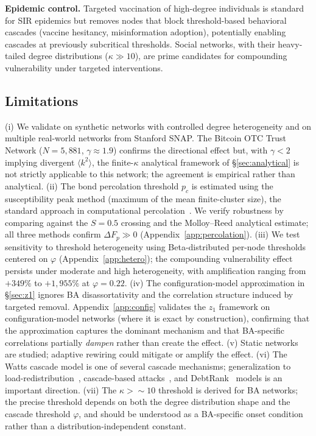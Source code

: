 \documentclass[aps,pre,twocolumn,superscriptaddress,showpacs]{revtex4-2}
\newcommand{\avg}[1]{\langle #1 \rangle}
\newcommand{\pc}{p_c}
\newcommand{\DF}{\Delta F}
\begin{document}
\textbf{Epidemic control.} Targeted vaccination of high-degree individuals is standard for SIR epidemics but removes nodes that block threshold-based behavioral cascades (vaccine hesitancy, misinformation adoption), potentially enabling cascades at previously subcritical thresholds. Social networks, with their heavy-tailed degree distributions ($\kappa \gg 10$), are prime candidates for compounding vulnerability under targeted interventions.

\subsection{Limitations}
\label{sec:limitations}

(i) We validate on synthetic networks with controlled degree heterogeneity and on multiple real-world networks from Stanford SNAP. The Bitcoin OTC Trust Network ($N=5{,}881$, $\gamma \approx 1.9$) confirms the directional effect but, with $\gamma < 2$ implying divergent $\avg{k^2}$, the finite-$\kappa$ analytical framework of \S\ref{sec:analytical} is not strictly applicable to this network; the agreement is empirical rather than analytical. (ii) The bond percolation threshold $\pc$ is estimated using the susceptibility peak method (maximum of the mean finite-cluster size), the standard approach in computational percolation~\cite{Newman2001}. We verify robustness by comparing against the $S=0.5$ crossing and the Molloy--Reed analytical estimate; all three methods confirm $\DF_p \gg 0$ (Appendix~\ref{app:percolation}). (iii) We test sensitivity to threshold heterogeneity using Beta-distributed per-node thresholds centered on $\varphi$ (Appendix~\ref{app:hetero}); the compounding vulnerability effect persists under moderate and high heterogeneity, with amplification ranging from $+349\%$ to $+1{,}955\%$ at $\varphi=0.22$. (iv) The configuration-model approximation in \S\ref{sec:z1} ignores BA disassortativity and the correlation structure induced by targeted removal. Appendix~\ref{app:config} validates the $z_1$ framework on configuration-model networks (where it is exact by construction), confirming that the approximation captures the dominant mechanism and that BA-specific correlations partially \emph{dampen} rather than create the effect. (v) Static networks are studied; adaptive rewiring could mitigate or amplify the effect. (vi) The Watts cascade model is one of several cascade mechanisms; generalization to load-redistribution~\cite{Motter2004}, cascade-based attacks~\cite{Motter2002}, and DebtRank~\cite{Battiston2012} models is an important direction. (vii) The $\kappa > {\sim}10$ threshold is derived for BA networks; the precise threshold depends on both the degree distribution shape and the cascade threshold $\varphi$, and should be understood as a BA-specific onset condition rather than a distribution-independent constant.
\end{document}
